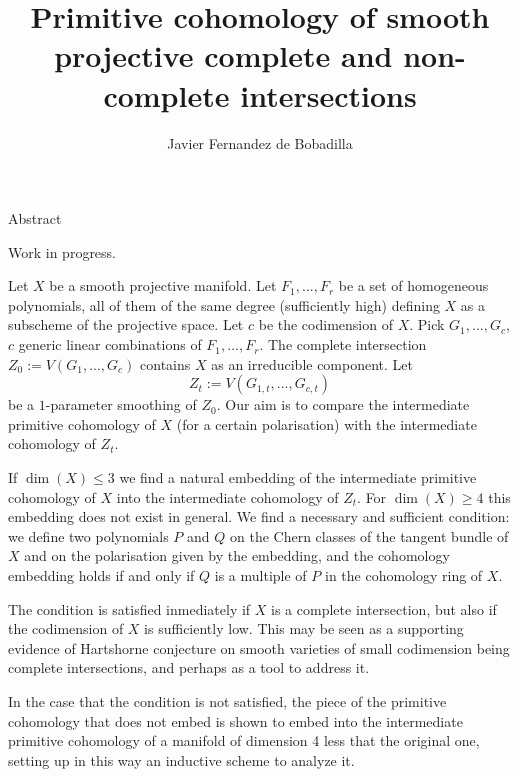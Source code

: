 \documentclass[a4paper,12pt]{article}
\begin{document}
\title{Primitive cohomology of smooth projective complete and non-complete intersections}
\author{Javier Fernandez de Bobadilla}
\date{}
\maketitle

\begin{center}
{\Large Abstract}
\end{center}

Work in progress. 

Let $X$ be a smooth projective manifold. Let $F_1,...,F_r$ be a set of homogeneous polynomials, all of them of the same degree (sufficiently high) defining $X$ as a 
subscheme of the projective space. Let $c$ be the codimension of $X$. Pick $G_1,...,G_c$, $c$ generic linear combinations of $F_1,...,F_r$. The complete intersection 
$Z_0:=V(G_1,...,G_c)$ contains $X$ as an irreducible component. Let 
$$Z_t:=V(G_{1,t},...,G_{c,t})$$
be a $1$-parameter smoothing of $Z_0$. Our aim is to compare the 
intermediate primitive cohomology of $X$ (for a certain polarisation) with the intermediate cohomology of $Z_t$.

If $\dim(X)\leq 3$ we find a natural embedding of the intermediate primitive cohomology of $X$ into the intermediate cohomology of $Z_t$. For $\dim(X)\geq 4$ this embedding does
not exist in general. We find a necessary and sufficient condition: we define two polynomials $P$ and $Q$ on the Chern classes of the tangent bundle of $X$ and 
on the polarisation given by the embedding, and the cohomology embedding holds if and only if $Q$ is a multiple of $P$ in the cohomology ring of $X$. 

The condition is satisfied inmediately if $X$ is a complete intersection, but also if the codimension of $X$ is sufficiently low. This may be seen as a supporting evidence of 
Hartshorne conjecture on smooth varieties of small codimension being complete intersections, and perhaps as a tool to address it.

In the case that the condition is not satisfied, the piece of the primitive cohomology that does not embed is shown to embed into the intermediate primitive cohomology of a manifold of dimension 4 less that the original one, setting up in this way an inductive scheme to analyze it.
\end{document}
